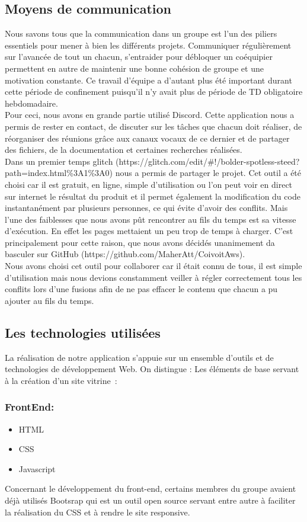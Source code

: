 \documentclass{article}
\begin{document}
\subsection{Moyens de communication}
Nous savons tous que la communication dans un groupe est l’un des piliers essentiels pour mener à bien les différents projets. Communiquer régulièrement sur l’avancée de tout un chacun, s’entraider pour débloquer un coéquipier permettent en autre de maintenir une bonne cohésion de groupe et une motivation constante. Ce travail d’équipe a d’autant plus été important durant cette période de confinement puisqu’il n’y avait plus de période de TD  obligatoire hebdomadaire.\\
Pour ceci, nous avons en grande partie utilisé Discord. Cette application nous a permis de rester en contact, de discuter sur les tâches que chacun doit réaliser, de réorganiser des réunions grâce aux canaux vocaux de ce dernier et de partager des fichiers, de la documentation et certaines recherches réalisées. \\
Dans un premier temps glitch (https://glitch.com/edit/#!/bolder-spotless-steed?path=index.html\%3A1\%3A0) nous a permis de partager le projet. Cet outil a été choisi car il est  gratuit, en ligne, simple d’utilisation ou l’on peut voir en direct sur internet le résultat du produit et il permet également la modification du code instantanément par plusieurs personnes, ce qui évite d’avoir des conflits. Mais l’une des faiblesses que nous avons pût rencontrer au fils du temps est sa vitesse d’exécution. En effet les pages mettaient un peu trop de temps à charger. C’est principalement pour cette raison, que nous avons décidés unanimement da basculer sur  GitHub (https://github.com/MaherAtt/CoivoitAws). \\  Nous avons choisi cet outil pour collaborer car il était connu de tous, il est simple d’utilisation mais nous devions constamment veiller à régler correctement tous les conflits lors d’une fusions afin de ne pas effacer le contenu que chacun a pu ajouter au fils du temps.  

\subsection{Les technologies utilisées}
La réalisation de notre application s'appuie sur un ensemble d'outils et de technologies de développement Web. On distingue :
Les éléments de base servant à la création d’un site vitrine : 
\subsubsection{FrontEnd:}
\begin{itemize}
    \item HTML
    \item CSS
    \item Javascript
\end{itemize}
Concernant le développement du front-end, certains membres du groupe avaient déjà utilisés Bootsrap qui est un outil open source servant entre autre à faciliter la réalisation du CSS et à rendre le site responsive.
\end{document}
